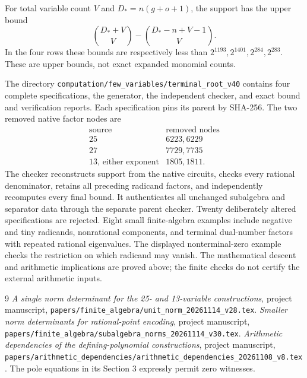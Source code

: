 \documentclass[11pt,a4paper]{article}
\begin{document}
For total variable count $V$ and $D_*=n(g+o+1)$, the support has the
upper bound
\[
 \binom{D_*+V}{V}-\binom{D_*-n+V-1}{V}.
\]
In the four rows these bounds are respectively less than
$2^{1193},2^{1401},2^{284},2^{283}$. These are upper bounds, not exact
expanded monomial counts.

The directory
\nolinkurl{computation/few_variables/terminal_root_v40}
contains four complete specifications, the generator, the independent
checker, and exact bound and verification reports. Each specification
pins its parent by SHA-256. The two removed native factor nodes are
\[
 \begin{array}{c|c}
 \text{source}&\text{removed nodes}\\\hline
 25&6223,6229\\
 27&7729,7735\\
 13\text{, either exponent}&1805,1811.
 \end{array}
\]
The checker reconstructs support from the native circuits, checks every
rational denominator, retains all preceding radicand factors, and
independently recomputes every final bound. It authenticates all
unchanged subalgebra and separator data through the separate parent
checker. Twenty deliberately altered specifications are rejected.
Eight small finite-algebra examples include negative and tiny radicands,
nonrational components, and terminal dual-number factors with repeated
rational eigenvalues. The displayed nonterminal-zero example checks the
restriction on which radicand may vanish. The mathematical descent and
arithmetic implications are proved above; the finite checks do not
certify the external arithmetic inputs.

\begin{thebibliography}{9}
 \emph{A single norm determinant for the 25- and
13-variable constructions}, project manuscript,
\nolinkurl{papers/finite_algebra/unit_norm_20261114_v28.tex}.
 \emph{Smaller norm determinants for rational-point
encoding}, project manuscript,
\nolinkurl{papers/finite_algebra/subalgebra_norms_20261114_v30.tex}.
 \emph{Arithmetic dependencies of the
defining-polynomial constructions}, project manuscript,
\nolinkurl{papers/arithmetic_dependencies/arithmetic_dependencies_20261108_v8.tex}.
The pole equations in its Section 3 expressly permit zero witnesses.
\end{thebibliography}
\end{document}
